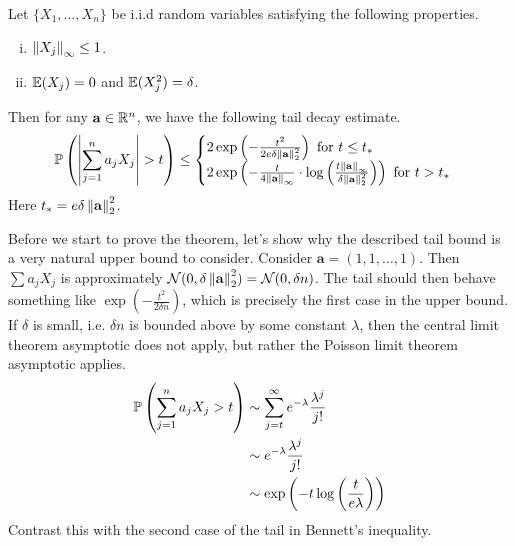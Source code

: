 \documentclass[11pt]{article}
\begin{document}
\begin{theorem}
  \label{thm:bennett}
  Let $\{X_1, \ldots, X_n\}$ be i.i.d random variables satisfying the following properties.
  \begin{enumerate}[(i)]
  \item $\norm{X_j}_{\infty} \leq 1$.
  \item $\E(X_j) = 0$ and $\E(X_j^2) = \delta$.
  \end{enumerate}
  Then for any $\mathbf{a} \in \R^n$, we have the following tail decay estimate.
  \begin{align*}
    \P\left( \left| \sum_{j=1}^n a_j X_j \right| > t \right) \leq
    \begin{cases}
      2 \exp \left(- \frac{t^2}{2e\delta \norm{\mathbf{a}}_2^2} \right)\text{ for $t \leq t_{\ast}$} \\
      2 \exp \left( - \frac{t}{4 \norm{\mathbf{a}}_{\infty}} \cdot \log\left( \frac{t \norm{\mathbf{a}}_{\infty}}{\delta \norm{\mathbf{a}}_2^2} \right) \right)\text{ for $t > t_{\ast}$}
    \end{cases}
  \end{align*}
  Here $t_{\ast} = e\delta \norm{\mathbf{a}}_2^2$.
\end{theorem}
Before we start to prove the theorem, let's show why the described tail bound is a very natural upper bound to consider.
Consider $\mathbf{a} = (1, 1, \ldots, 1)$.
Then $\sum a_j X_j$ is approximately $\cN(0, \delta \norm{\mathbf{a}}^2_2) = \cN(0, \delta n)$.
The tail should then behave something like $\exp \left( - \frac{t^2}{2\delta n} \right)$, which is precisely the first case in the upper bound.
If $\delta$ is small, i.e. $\delta n$ is bounded above by some constant $\lambda$, then the central limit theorem asymptotic does not apply, but rather the Poisson limit theorem asymptotic applies.
\begin{align*}
  \P\left( \sum_{j=1}^n a_j X_j > t \right) &\sim \sum_{j=t}^{\infty} e^{-\lambda} \frac{\lambda^j}{j!} \\
                                            &\sim e^{-\lambda} \frac{\lambda^j}{j!} \\
                                            &\sim \exp\left( -t \log\left( \frac{t}{e\lambda} \right) \right)
\end{align*}
Contrast this with the second case of the tail in Bennett's inequality.
\end{document}

